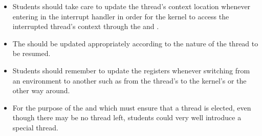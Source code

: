 \begin{itemize}
  \item
    Students should take care to update the thread's context location
    \ie{}  whenever entering in the interrupt
    handler in order for the kernel to access the interrupted thread's context
    through the  and
    .
  \item
    The  should be updated appropriately
    according to the nature of the thread to be resumed.
  \item
    Students should remember to update the registers whenever switching
    from an environment to another such as from the thread's to the kernel's
    or the other way around.
  \item
    For the purpose of the  and
     which must ensure that a thread is
    elected, even though there may be no thread left, students could
    very well introduce a special thread.
\end{itemize}
